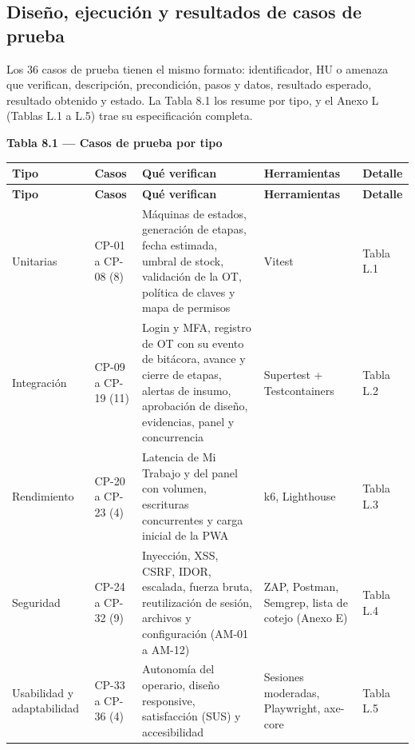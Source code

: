 \documentclass[11pt,a4paper]{article}
\begin{document}
\subsection{Diseño, ejecución y resultados de casos de prueba}

Los 36 casos de prueba tienen el mismo formato: identificador, HU o amenaza que verifican, descripción, precondición, pasos y datos, resultado esperado, resultado obtenido y estado. La Tabla 8.1 los resume por tipo, y el Anexo L (Tablas L.1 a L.5) trae su especificación completa.

\textbf{Tabla 8.1 --- Casos de prueba por tipo}\nopagebreak

\begingroup\small
\begin{longtable}{@{}>{\raggedright\arraybackslash\hspace{0pt}}p{}>{\raggedright\arraybackslash\hspace{0pt}}p{}>{\raggedright\arraybackslash\hspace{0pt}}p{}>{\raggedright\arraybackslash\hspace{0pt}}p{}>{\raggedright\arraybackslash\hspace{0pt}}p{}@{}}
\toprule
\textbf{Tipo} & \textbf{Casos} & \textbf{Qué verifican} & \textbf{Herramientas} & \textbf{Detalle} \\ \midrule
\endfirsthead
\toprule
\textbf{Tipo} & \textbf{Casos} & \textbf{Qué verifican} & \textbf{Herramientas} & \textbf{Detalle} \\ \midrule
\endhead
\bottomrule
\endlastfoot
\mbox{Unitarias} & \mbox{CP-01} a \mbox{CP-08} (8) & Máquinas de estados, generación de etapas, fecha estimada, umbral de stock, validación de la OT, política de claves y mapa de permisos & \mbox{Vitest} & Tabla L.1 \\ \addlinespace[0.25em]
Integración & \mbox{CP-09} a \mbox{CP-19} (11) & Login y MFA, registro de OT con su evento de bitácora, avance y cierre de etapas, alertas de insumo, aprobación de diseño, evidencias, panel y concurrencia & Supertest + Testcontainers & Tabla L.2 \\ \addlinespace[0.25em]
\mbox{Rendimiento} & \mbox{CP-20} a \mbox{CP-23} (4) & Latencia de Mi Trabajo y del panel con volumen, escrituras concurrentes y carga inicial de la PWA & k6, Lighthouse & Tabla L.3 \\ \addlinespace[0.25em]
\mbox{Seguridad} & \mbox{CP-24} a \mbox{CP-32} (9) & Inyección, XSS, CSRF, IDOR, escalada, fuerza bruta, reutilización de sesión, archivos y configuración (\mbox{AM-01} a \mbox{AM-12}) & ZAP, Postman, Semgrep, lista de cotejo (Anexo E) & Tabla L.4 \\ \addlinespace[0.25em]
Usabilidad y adaptabilidad & \mbox{CP-33} a \mbox{CP-36} (4) & Autonomía del operario, diseño responsive, satisfacción (SUS) y accesibilidad & Sesiones moderadas, Playwright, axe-core & Tabla L.5 \\
\end{longtable}
\endgroup
\end{document}

